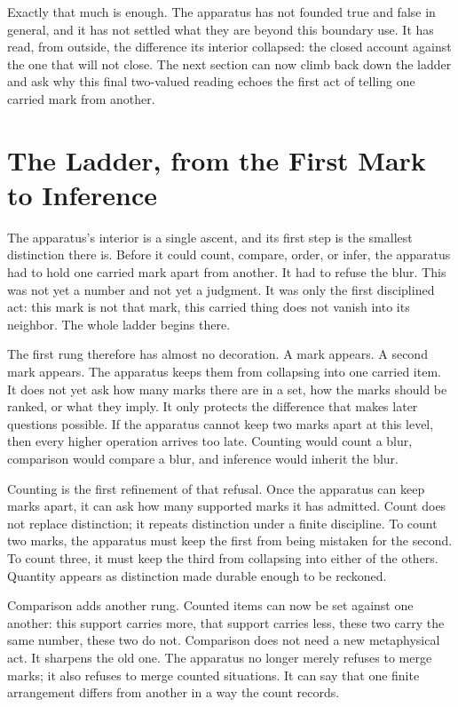 Exactly that much is enough. The apparatus has not founded true and false in
general, and it has not settled what they are beyond this boundary use. It has
read, from outside, the difference its interior collapsed: the closed account
against the one that will not close. The next section can now climb back down
the ladder and ask why this final two-valued reading echoes the first act of
telling one carried mark from another.

\section{The Ladder, from the First Mark to Inference}

The apparatus's interior is a single ascent, and its first step is the smallest
distinction there is. Before it could count, compare, order, or infer, the
apparatus had to hold one carried mark apart from another. It had to refuse
the blur. This was not yet a number and not yet a judgment. It was only the
first disciplined act: this mark is not that mark, this carried thing does not
vanish into its neighbor. The whole ladder begins there.

The first rung therefore has almost no decoration. A mark appears. A second
mark appears. The apparatus keeps them from collapsing into one carried item.
It does not yet ask how many marks there are in a set, how the marks should be
ranked, or what they imply. It only protects the difference that makes later
questions possible. If the apparatus cannot keep two marks apart at this
level, then every higher operation arrives too late. Counting would count a
blur, comparison would compare a blur, and inference would inherit the blur.

Counting is the first refinement of that refusal. Once the apparatus can keep
marks apart, it can ask how many supported marks it has admitted. Count does
not replace distinction; it repeats distinction under a finite discipline. To
count two marks, the apparatus must keep the first from being mistaken for the
second. To count three, it must keep the third from collapsing into either of
the others. Quantity appears as distinction made durable enough to be
reckoned.

Comparison adds another rung. Counted items can now be set against one another:
this support carries more, that support carries less, these two carry the same
number, these two do not. Comparison does not need a new metaphysical act. It
sharpens the old one. The apparatus no longer merely refuses to merge marks;
it also refuses to merge counted situations. It can say that one finite
arrangement differs from another in a way the count records.


